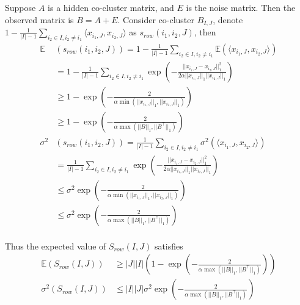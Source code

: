 \documentclass[journal]{IEEEtran}
\begin{document}
Suppose $A$ is a hidden co-cluster matrix, and $E$ is the noise matrix. Then the observed matrix is $B = A + E$. Consider co-cluster $B_{I,J}$, denote $1 - \frac{1}{|I|-1} \sum_{i_2 \in I, i_2 \neq i_1} \langle x_{i_1,J}, x_{i_2,J}\rangle$ as $s_{row}(i_1, i_2, J)$, then
\begin{align*}
  \mathbb{E}&(s_{row}(i_1, i_2, J))  = 1 - \frac{1}{|I|-1} \sum_{i_2 \in I, i_2 \neq i_1} \mathbb{E}(\langle x_{i_1,J}, x_{i_2,J}\rangle)                                    \\
                                   & = 1 - \frac{1}{|I|-1} \sum_{i_2 \in I, i_2 \neq i_1} \exp(-\frac{||x_{i_1,J} - x_{i_2,J}||_1^2}{2\alpha||x_{i_1,J}||_1||x_{i_2,J}||_1}) \\
                                   & \ge 1 - \exp(-\frac{2}{\alpha \min(||x_{i_1,J}||_1, ||x_{i_2,J}||_1)})                                                                  \\
                                   & \ge 1 - \exp(-\frac{2}{\alpha \max(||B||_1, ||B^\top||_1)})                                                                             \\
  \sigma^2&(s_{row}(i_1, i_2, J))   = \frac{1}{|I|-1} \sum_{i_2 \in I, i_2 \neq i_1} \sigma^2(\langle x_{i_1,J}, x_{i_2,J}\rangle)                                          \\
                                   & = \frac{1}{|I|-1} \sum_{i_2 \in I, i_2 \neq i_1} \exp(-\frac{||x_{i_1,J} - x_{i_2,J}||_1^2}{2\alpha||x_{i_1,J}||_1||x_{i_2,J}||_1})     \\
                                   & \le \sigma^2 \exp(-\frac{2}{\alpha \min(||x_{i_1,J}||_1, ||x_{i_2,J}||_1)})                                                             \\
                                   & \le \sigma^2 \exp(-\frac{2}{\alpha \max(||B||_1, ||B^\top||_1)})                                                                        \\
\end{align*}

Thus the expected value of $S_{row}(I,J)$ satisfies
\begin{align*}
  \mathbb{E}(S_{row}(I,J)) & \ge |J||I| \left(1 - \exp(-\frac{2}{\alpha \max(||B||_1, ||B^\top||_1)}) \right) \\
  \sigma^2(S_{row}(I,J))   & \le |I||J| \sigma^2 \exp(-\frac{2}{\alpha \max(||B||_1, ||B^\top||_1)})          \\
\end{align*}
\end{document}
